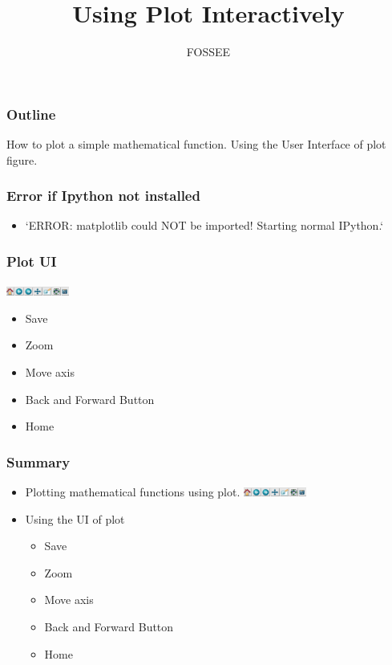 \documentclass[presentation]{beamer}
\title{Using Plot Interactively}
\author{FOSSEE}
\date{}
\begin{document}
\maketitle









\begin{frame}
\frametitle{Outline}
\label{sec-1}

  How to plot a simple mathematical function.
  Using the User Interface of plot figure.
\end{frame}
\begin{frame}
\frametitle{Error if Ipython not installed}
\label{sec-2}
\begin{itemize}

\item `ERROR: matplotlib could NOT be imported!  Starting normal IPython.`\\
\label{sec-2_1}%
\end{itemize} %
\end{frame}
\begin{frame}
\frametitle{Plot UI}
\label{sec-3}

   \includegraphics[height=0.12in, interpolate=true]{buttons}
\begin{itemize}
\item Save
\item Zoom
\item Move axis
\item Back and Forward Button
\item Home
\end{itemize}


    
\end{frame}
\begin{frame}
\frametitle{Summary}
\label{sec-4}

\begin{itemize}
\item Plotting mathematical functions using plot.
   \includegraphics[height=0.12in, interpolate=true]{buttons}
\item Using the UI of plot

\begin{itemize}
\item Save
\item Zoom
\item Move axis
\item Back and Forward Button
\item Home
\end{itemize}

\end{itemize}

  
  
\end{frame}
\end{document}
